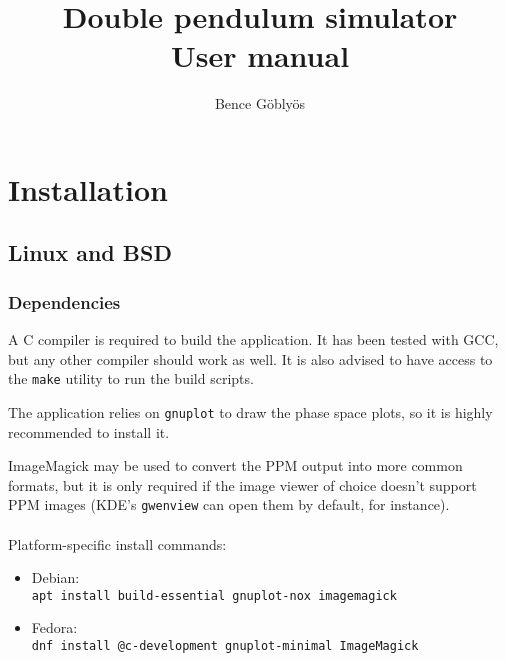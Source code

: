 \documentclass[a4paper,12pt]{article}
\title{Double pendulum simulator\\User manual}
\author{Bence Göblyös}
\begin{document}
\maketitle
\newpage
{}

\section{Installation}

\subsection{Linux and BSD}

\subsubsection{Dependencies}
A C compiler is required to build the application.
It has been tested with GCC, but any other compiler should work as well.
It is also advised to have access to the \texttt{make} utility to run the build scripts.

The application relies on \texttt{gnuplot} to draw the phase space plots,
so it is highly recommended to install it.

ImageMagick may be used to convert the PPM output into more common formats,
but it is only required if the image viewer of choice doesn't support PPM images
(KDE's \texttt{gwenview} can open them by default, for instance).\\\\
Platform-specific install commands:
\begin{itemize}
 \item Debian:\\ \texttt{apt install build-essential gnuplot-nox imagemagick}
 \item Fedora:\\ \texttt{dnf install @c-development gnuplot-minimal ImageMagick}
\end{itemize}
\end{document}
